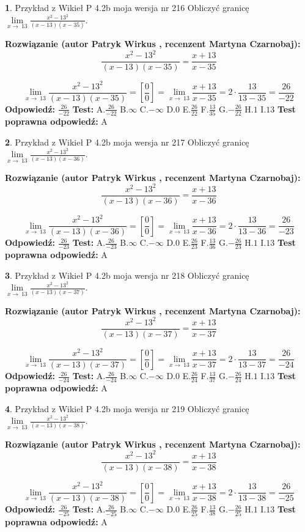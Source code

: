 \documentclass[12pt, a4paper]{article}
\theoremstyle{definition} %
\newtheorem{zad}{}
\newcommand{\zadStart}[1]{\begin{zad}#1\newline}
\newcommand{\zadStop}{\end{zad}}
\newcommand{\rozwStart}[2]{\noindent \textbf{Rozwiązanie (autor #1 , recenzent #2): }\newline}
\newcommand{\rozwStop}{\newline}
\newcommand{\odpStart}{\noindent \textbf{Odpowiedź:}\newline}
\newcommand{\odpStop}{\newline}
\newcommand{\testStart}{\noindent \textbf{Test:}\newline}
\newcommand{\testStop}{\newline}
\newcommand{\kluczStart}{\noindent \textbf{Test poprawna odpowiedź:}\newline}
\newcommand{\kluczStop}{\newline}
\begin{document}
\zadStart{Przykład z Wikieł P 4.2b moja wersja nr 216}
Obliczyć granicę $\lim\limits_{x\to\ 13}\frac{x^{2}-13^{2}}{(x-13)(x-35)}$.
\zadStop
\rozwStart{Patryk Wirkus}{Martyna Czarnobaj}
$$\frac{x^{2}-13^{2}}{(x-13)(x-35)}=\frac{x+13}{x-35}$$

$$\lim\limits_{x\to\ 13}\frac{x^{2}-13^{2}}{(x-13)(x-35)}=[\frac{0}{0}]=\lim\limits_{x\to\ 13}\frac{x+13}{x-35}=2 \cdot \frac{13}{13-35} = \frac{26}{-22}$$
\rozwStop
\odpStart
$\frac{26}{-22}$
\odpStop
\testStart
A.$\frac{26}{-22}$
B.$\infty$
C.$-\infty$
D.$0$
E.$\frac{26}{22}$
F.$\frac{13}{35}$
G.$-\frac{26}{22}$
H.$1$
I.$13$
\testStop
\kluczStart
A
\kluczStop



\zadStart{Przykład z Wikieł P 4.2b moja wersja nr 217}
Obliczyć granicę $\lim\limits_{x\to\ 13}\frac{x^{2}-13^{2}}{(x-13)(x-36)}$.
\zadStop
\rozwStart{Patryk Wirkus}{Martyna Czarnobaj}
$$\frac{x^{2}-13^{2}}{(x-13)(x-36)}=\frac{x+13}{x-36}$$

$$\lim\limits_{x\to\ 13}\frac{x^{2}-13^{2}}{(x-13)(x-36)}=[\frac{0}{0}]=\lim\limits_{x\to\ 13}\frac{x+13}{x-36}=2 \cdot \frac{13}{13-36} = \frac{26}{-23}$$
\rozwStop
\odpStart
$\frac{26}{-23}$
\odpStop
\testStart
A.$\frac{26}{-23}$
B.$\infty$
C.$-\infty$
D.$0$
E.$\frac{26}{23}$
F.$\frac{13}{36}$
G.$-\frac{26}{23}$
H.$1$
I.$13$
\testStop
\kluczStart
A
\kluczStop



\zadStart{Przykład z Wikieł P 4.2b moja wersja nr 218}
Obliczyć granicę $\lim\limits_{x\to\ 13}\frac{x^{2}-13^{2}}{(x-13)(x-37)}$.
\zadStop
\rozwStart{Patryk Wirkus}{Martyna Czarnobaj}
$$\frac{x^{2}-13^{2}}{(x-13)(x-37)}=\frac{x+13}{x-37}$$

$$\lim\limits_{x\to\ 13}\frac{x^{2}-13^{2}}{(x-13)(x-37)}=[\frac{0}{0}]=\lim\limits_{x\to\ 13}\frac{x+13}{x-37}=2 \cdot \frac{13}{13-37} = \frac{26}{-24}$$
\rozwStop
\odpStart
$\frac{26}{-24}$
\odpStop
\testStart
A.$\frac{26}{-24}$
B.$\infty$
C.$-\infty$
D.$0$
E.$\frac{26}{24}$
F.$\frac{13}{37}$
G.$-\frac{26}{24}$
H.$1$
I.$13$
\testStop
\kluczStart
A
\kluczStop



\zadStart{Przykład z Wikieł P 4.2b moja wersja nr 219}
Obliczyć granicę $\lim\limits_{x\to\ 13}\frac{x^{2}-13^{2}}{(x-13)(x-38)}$.
\zadStop
\rozwStart{Patryk Wirkus}{Martyna Czarnobaj}
$$\frac{x^{2}-13^{2}}{(x-13)(x-38)}=\frac{x+13}{x-38}$$

$$\lim\limits_{x\to\ 13}\frac{x^{2}-13^{2}}{(x-13)(x-38)}=[\frac{0}{0}]=\lim\limits_{x\to\ 13}\frac{x+13}{x-38}=2 \cdot \frac{13}{13-38} = \frac{26}{-25}$$
\rozwStop
\odpStart
$\frac{26}{-25}$
\odpStop
\testStart
A.$\frac{26}{-25}$
B.$\infty$
C.$-\infty$
D.$0$
E.$\frac{26}{25}$
F.$\frac{13}{38}$
G.$-\frac{26}{25}$
H.$1$
I.$13$
\testStop
\kluczStart
A
\kluczStop
\end{document}
